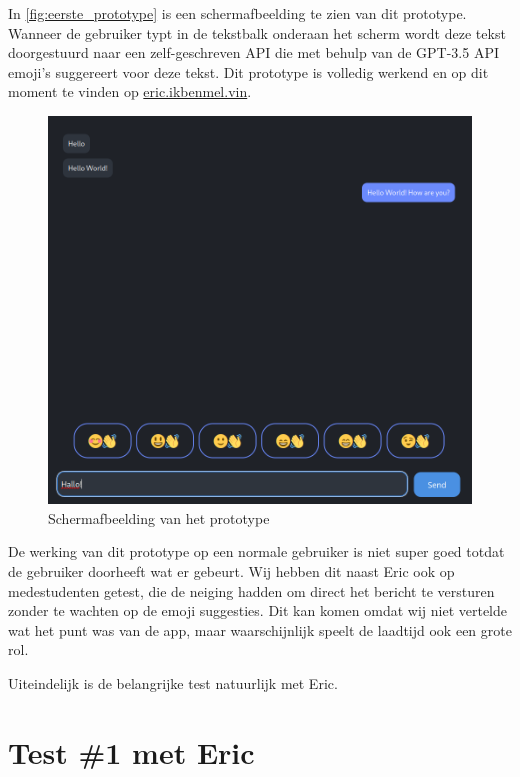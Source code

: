 \documentclass[12pt]{article}
\begin{document}
\def\figureautorefname{figuur}
In \autoref{fig:eerste_prototype} is een schermafbeelding te zien van dit prototype.
Wanneer de gebruiker typt in de tekstbalk onderaan het scherm wordt deze tekst doorgestuurd naar een zelf-geschreven API die met behulp van de GPT-3.5 API emoji's suggereert voor deze tekst.
Dit prototype is volledig werkend en op dit moment te vinden op \href{https://eric.ikbenmel.vin}{eric.ikbenmel.vin}.

\begin{figure}[h]
	\centering
	\includegraphics[width=1\textwidth]{eerste_prototype_1}
	\caption{Schermafbeelding van het prototype}
	\label{fig:eerste_prototype}
\end{figure}

De werking van dit prototype op een normale gebruiker is niet super goed totdat de gebruiker doorheeft wat er gebeurt.
Wij hebben dit naast Eric ook op medestudenten getest, die de neiging hadden om direct het bericht te versturen zonder te wachten op de emoji suggesties.
Dit kan komen omdat wij niet vertelde wat het punt was van de app, maar waarschijnlijk speelt de laadtijd ook een grote rol.

Uiteindelijk is de belangrijke test natuurlijk met Eric.

\section{Test \#1 met Eric}
\end{document}
